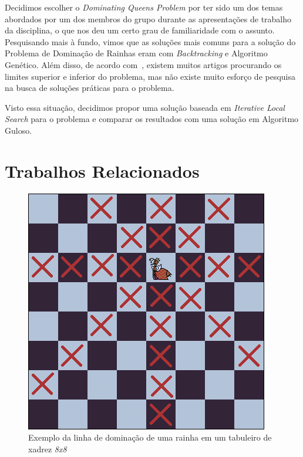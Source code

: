 \documentclass[sigconf]{acmart}
\begin{document}
Decidimos escolher o \textit{Dominating Queens Problem} por ter sido um dos temas abordados por um dos membros do grupo durante as apresentações de trabalho da disciplina, o que nos deu um certo grau de familiaridade com o assunto. Pesquisando mais à fundo, vimos que as soluções mais comuns para a solução do Problema de Dominação de Rainhas eram com \textit{Backtracking} e Algoritmo Genético. Além disso, de acordo com~\cite{alharbi2017genetic}, existem muitos artigos procurando os limites superior e inferior do problema, mas não existe muito esforço de pesquisa
na busca de soluções práticas para o problema.

Visto essa situação, decidimos propor uma solução baseada em \textit{Iterative Local Search} para o problema e comparar os resultados com uma solução em Algoritmo Guloso.

\section{Trabalhos Relacionados}

\begin{figure}
  \includegraphics[width=\linewidth]{dom1rainha8x8.png}
  \caption{Exemplo da linha de dominação de uma rainha em um tabuleiro de xadrez \textit{8x8}}
  \label{fig:1rainha}
\end{figure}
\end{document}
